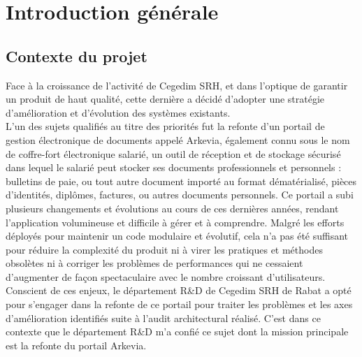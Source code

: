 {}
\noindent \section*{Introduction générale}

{}
\subsection*{Contexte du projet}
Face à la croissance de l'activité de Cegedim SRH, et dans l’optique de garantir un produit de haut qualité, cette dernière a décidé d’adopter une stratégie d’amélioration et d’évolution des systèmes existants.\\

L'un des sujets qualifiés au titre des priorités fut la refonte d'un portail de gestion électronique de documents appelé Arkevia, également connu sous le nom de coffre-fort électronique salarié, un outil de réception et de stockage sécurisé dans lequel le salarié peut stocker ses documents professionnels et personnels : bulletins de paie, ou tout autre document importé au format dématérialisé, pièces d'identités, diplômes, factures, ou autres documents personnels. Ce portail a subi plusieurs changements et évolutions au cours de ces dernières années, rendant l'application volumineuse et difficile à gérer et à comprendre. Malgré les efforts déployés pour maintenir un code modulaire et évolutif, cela n'a pas été suffisant pour réduire la complexité du produit ni à virer les pratiques et méthodes obsolètes ni à corriger les problèmes de performances qui ne cessaient d'augmenter de façon spectaculaire avec le nombre croissant d'utilisateurs.\\

Conscient de ces enjeux, le département R\&D de Cegedim SRH de Rabat a opté pour s'engager dans la refonte de ce portail pour traiter les problèmes et les axes d’amélioration identifiés suite à l’audit architectural réalisé. C'est dans ce contexte que le département R\&D m'a confié ce sujet dont la mission principale est la refonte du portail Arkevia.

